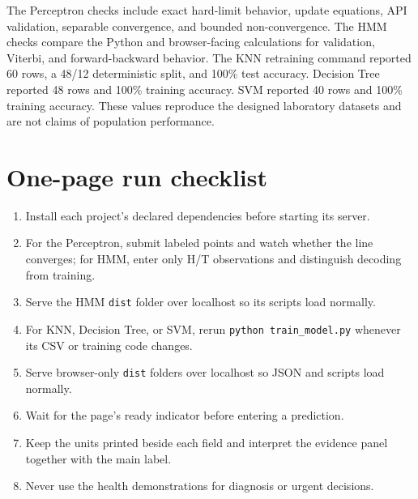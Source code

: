 \documentclass[12pt,a4paper,openany]{report}
\begin{document}
\ifdefined\AssignmentVersion
The Perceptron checks include exact hard-limit behavior, update equations, API
validation, separable convergence, and bounded non-convergence. The HMM checks
compare the Python and browser-facing calculations for validation, Viterbi, and
forward-backward behavior.
\else
The KNN retraining command reported 60 rows, a 48/12 deterministic split, and
100\% test accuracy. Decision Tree reported 48 rows and 100\% training accuracy.
SVM reported 40 rows and 100\% training accuracy. These values reproduce the
designed laboratory datasets and are not claims of population performance.
\fi

\section{One-page run checklist}
\begin{enumerate}
  \item Install each project's declared dependencies before starting its server.
\ifdefined\AssignmentVersion
  \item For the Perceptron, submit labeled points and watch whether the line
  converges; for HMM, enter only H/T observations and distinguish decoding from
  training.
  \item Serve the HMM \texttt{dist} folder over localhost so its scripts load
  normally.
\else
  \item For KNN, Decision Tree, or SVM, rerun \texttt{python train\_model.py}
  whenever its CSV or training code changes.
  \item Serve browser-only \texttt{dist} folders over localhost so JSON and
  scripts load normally.
\fi
  \item Wait for the page's ready indicator before entering a prediction.
  \item Keep the units printed beside each field and interpret the evidence
  panel together with the main label.
\ifdefined\AssignmentVersion\else
  \item Never use the health demonstrations for diagnosis or urgent decisions.
\fi
\end{enumerate}
\end{document}

